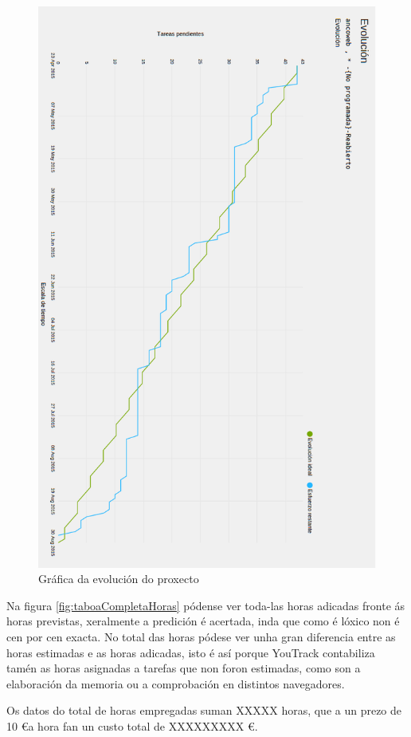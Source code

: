 \begin{figure}[htp]
\begin{center}
    \includegraphics[scale=0.35]{figures/YouTrack/evolucionProxecto.png}
    \caption{Gráfica da evolución do proxecto}
\label{fig:fluxoAcumulado}
\end{center}
\end{figure}

Na figura \ref{fig:taboaCompletaHoras} pódense ver toda-las horas adicadas fronte ás horas
previstas, xeralmente a predición é acertada, inda que como é lóxico non é cen por cen exacta. No 
total das horas pódese ver unha gran diferencia entre as horas estimadas e as horas adicadas, isto é
así porque YouTrack contabiliza tamén as horas asignadas a tarefas que non foron estimadas, como son
a elaboración da memoria ou a comprobación en distintos navegadores.



Os datos do total de horas empregadas suman XXXXX horas, que a un prezo de 10 \euro a hora fan un custo
total de XXXXXXXXX \euro.
